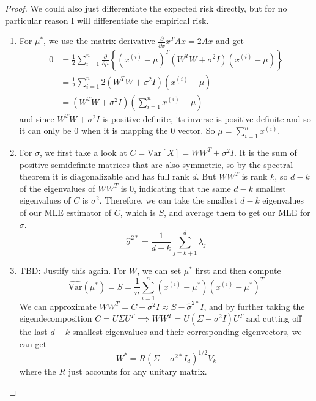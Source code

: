   \begin{proof}
    We could also just differentiate the expected risk directly, but for no particular reason I will differentiate the empirical risk. 
    \begin{enumerate}
      \item For $\mu^\ast$, we use the matrix derivative $\frac{\partial}{\partial x} x^T A x = 2 A x$ and get 
      \begin{align}
        0 & = \frac{1}{2} \sum_{i=1}^n \frac{\partial}{\partial \mu} \left\{ (x^{(i)} - \mu)^T (W^T W + \sigma^2 I) (x^{(i)} - \mu) \right\} \\ 
          & = \frac{1}{2} \sum_{i=1}^n 2 (W^T W + \sigma^2 I) (x^{(i)} - \mu) \\ 
          & = (W^T W + \sigma^2 I) \left( \sum_{i=1}^n x^{(i)} - \mu \right)
      \end{align} 
      and since $W^T W + \sigma^2 I$ is positive definite, its inverse is positive definite and so it can only be $0$ when it is mapping the $0$ vector. So $\mu = \sum_{i=1}^n x^{(i)}$. 

      \item For $\sigma$, we first take a look at $C = \mathrm{Var}[X] = W W^T + \sigma^2 I$. It is the sum of positive semidefinite matrices that are also symmetric, so by the spectral theorem it is diagonalizable and has full rank $d$. But $W W^T$ is rank $k$, so $d - k$ of the eigenvalues of $W W^T$ is $0$, indicating that the same $d-k$ smallest eigenvalues of $C$ is $\sigma^2$. Therefore, we can take the smallest $d-k$ eigenvalues of our MLE estimator of $C$, which is $S$, and average them to get our MLE for $\sigma$. 
      \begin{equation}
        \hat{\sigma}^{2\ast} = \frac{1}{d-k} \sum_{j=k+1}^d \lambda_j
      \end{equation}
      \item TBD: Justify this again. For $W$, we can set $\mu^\ast$ first and then compute 
      \begin{equation}
        \widehat{\mathrm{Var}}(\mu^{\ast}) = S = \frac{1}{n} \sum_{i=1}^n (x^{(i)} - \mu^{\ast}) (x^{(i)} - \mu^{\ast})^T
      \end{equation}
      We can approximate $W W^T = C - \sigma^2 I \approx S - \hat{\sigma}^{2\ast} I$, and by further taking the eigendecomposition $C = U \Sigma U^T \implies W W^T = U (\Sigma - \sigma^2 I) U^T$ and cutting off the last $d-k$ smallest eigenvalues and their corresponding eigenvectors, we can get 
      \begin{equation}
        W^{\ast} = R (\Sigma - \sigma^{2 \ast} I_d )^{1/2} V_k
      \end{equation}
      where the $R$ just accounts for any unitary matrix. 
    \end{enumerate}
  \end{proof}

